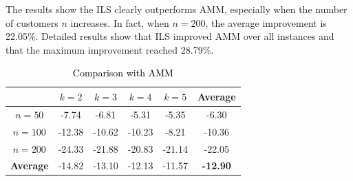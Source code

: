 \documentclass{article}
\begin{document}
The results show the ILS clearly outperforms AMM, especially when the number of customers $n$ increases. In fact, when $n=200$, the average improvement is 22.05\%. Detailed results show that ILS improved AMM over all instances and that the maximum improvement reached 28.79\%.

\begin{table}
\centering
\caption{\textcolor{black}{Comparison with AMM}}
\label{tab:prel_res}
\begin{tabular}{c||c|c|c|c||c} 
	&	$k=2$	&	$k=3$	&	$k=4$	&	$k=5$	&	\textbf{Average}	\\
\hline											
\hline											
$n=50$	&	-7.74	&	-6.81	&	-5.31	&	-5.35	&	-6.30	\\
\hline											
$n=100$	&	-12.38	&	-10.62	&	-10.23	&	-8.21	&	-10.36	\\
\hline											
$n=200$	&	-24.33	&	-21.88	&	-20.83	&	-21.14	&	-22.05	\\
\hline											
\hline											
\textbf{Average}	&	-14.82	&	-13.10	&	-12.13	&	-11.57	&	\textbf{-12.90}	\\
					
\end{tabular}
\end{table}

 

\end{document}
